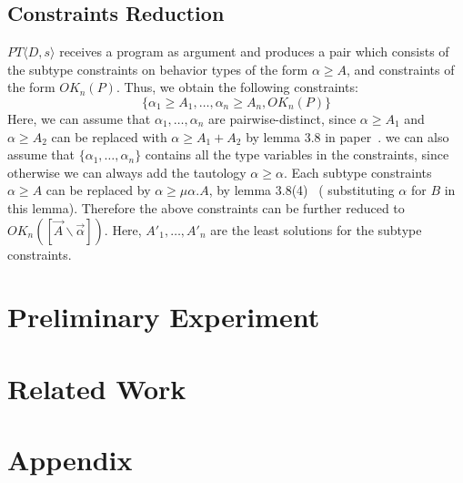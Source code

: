 \documentclass[english]{jssst_ppl} %
\theoremstyle{definition}
\begin{document}
\subsection{Constraints Reduction}
$PT\langle D, s \rangle$ receives a program as argument and produces a pair which consists of the subtype constraints on behavior types of the form $\alpha \ge A$, and constraints of the form $OK_{n}(P)$. Thus, we obtain the following constraints:\\
$$
\{ \alpha_{1} \ge A_{1}, \dots, \alpha_{n} \ge  A_{n}, OK_{n}(P)\}
$$
Here, we can assume that $\alpha_{1}, \dots, \alpha_{n}$ are pairwise-distinct, since $\alpha \ge A_{1}$ and $\alpha \ge A_{2}$ can be replaced with $\alpha \ge A_{1}+A_{2}$ by lemma 3.8 in paper~\cite{DBLP:journals/lmcs/KobayashiSW06}. we can also assume that $\{ \alpha_{1}, \dots, \alpha_{n} \}$ contains all the type variables in the constraints, since otherwise we can always add the tautology $\alpha \ge \alpha$. Each subtype constraints $\alpha \ge A$ can be replaced by $\alpha \ge \mu \alpha. A$, by lemma 3.8(4)~\cite{DBLP:journals/lmcs/KobayashiSW06} ( substituting $\alpha$ for $B$ in this lemma). Therefore the above constraints can be further reduced to $OK_{n}([\vec{A} \backslash \vec{\alpha}])$. Here, $A'_{1}, \dots, A'_{n}$ are the least solutions for the subtype constraints.

\section{Preliminary Experiment}

\section{Related Work}






\newpage
\appendix
\section*{Appendix}



\end{document}
